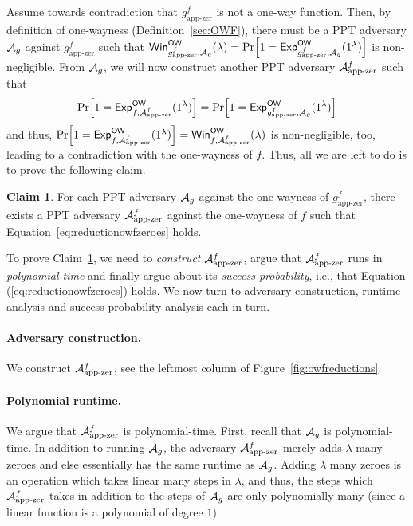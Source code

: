 \documentclass[a4paper,table,dvipsnames]{article}
\theoremstyle{definition}
\newtheorem{claim}{Claim}
\begin{document}
\medskip
Assume towards contradiction that $g^f_{\text{app-zer}}$ is not a one-way function. Then, by definition of one-wayness (Definition~\ref{sec:OWF}), there must be a PPT adversary $\mathcal{A}_g$ against $g^f_{\text{app-zer}}$ such that ${\sf{Win}}_{g^f_{\text{app-zer}},\adv_g}^{{\sf{OW}}}(\lambda)=\prob{1={\mathsf{Exp}}_{g^f_{\text{app-zer}},\adv_g}^{\mathsf{OW}}(1^\lambda)}$ is non-negligible. From $\mathcal{A}_g$, we will now construct another PPT adversary $\mathcal{A}^f_{\text{app-zer}}$ such that 
\begin{equation}\label{eq:reductionowfzeroes}
\prob{1={\mathsf{Exp}}_{f,\adv^f_{\text{app-zer}}}^{\mathsf{OW}}(1^\lambda)}=\prob{1={\mathsf{Exp}}_{g^f_{\text{app-zer}},\adv_g}^{\mathsf{OW}}(1^\lambda)}
\end{equation}
and thus, $\prob{1={\mathsf{Exp}}_{f,\adv^f_{\text{app-zer}}}^{\mathsf{OW}}(1^\lambda)}={\sf{Win}}_{f,\adv^f_{\text{app-zer}}}^{{\sf{OW}}}(\lambda)$ is non-negligible, too, leading to a contradiction with the one-wayness of $f$. Thus, all we are left to do is to prove the following claim.
\begin{claim}\label{claim:owfsimple}
For each PPT adversary $\mathcal{A}_g$ against the one-wayness of $g^f_{\text{app-zer}}$, there exists a PPT adversary $\mathcal{A}^f_{\text{app-zer}}$ against the one-wayness of $f$ such that Equation~\ref{eq:reductionowfzeroes} holds.
\end{claim}
To prove Claim~\ref{claim:owfsimple}, we need to \emph{construct} $\mathcal{A}^f_{\text{app-zer}}$, argue that $\mathcal{A}^f_{\text{app-zer}}$
runs in \emph{polynomial-time} and finally argue about its \emph{success probability}, i.e., that Equation (\ref{eq:reductionowfzeroes}) holds. We now turn to adversary construction, runtime analysis and success probability analysis each in turn.

\paragraph{Adversary construction.} We construct $\mathcal{A}^f_{\text{app-zer}}$, see the leftmost column of Figure~\ref{fig:owfreductions}. 

\paragraph{Polynomial runtime.} We argue that $\mathcal{A}^f_{\text{app-zer}}$ is polynomial-time. First, recall that $\mathcal{A}_g$ is polynomial-time. In addition to running $\mathcal{A}_g$, the adversary $\mathcal{A}^f_{\text{app-zer}}$ merely adds $\lambda$ many zeroes and else essentially has the same runtime as $\mathcal{A}_g$. Adding $\lambda$ many zeroes is an operation which takes linear many steps in $\lambda$, and thus, the steps which 
$\mathcal{A}^f_{\text{app-zer}}$ takes in addition to the steps of $\mathcal{A}_g$ are only polynomially many (since a linear function is a polynomial of degree $1$).
\end{document}
